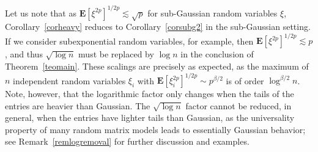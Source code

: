 \documentclass[aop,MSNbibl,dvips]{arximspdf}
\newcommand{\EE}{\mathbf{E}}
\begin{document}
Let us note that as $\EE[\xi^{2p}]^{1/2p}\lesssim\sqrt{p}$ for
sub-Gaussian random variables $\xi$, Corollary~\ref{corheavy} reduces
to Corollary~\ref{corsubg2} in the sub-Gaussian setting.\vspace*{1pt} If we consider
subexponential random variables, for example, then
$\EE[\xi^{2p}]^{1/2p}\lesssim p$, and thus $\sqrt{\log n}$ must be replaced
by $\log n$ in the conclusion of Theorem~\ref{teomain}. These scalings
are precisely as expected, as the maximum of $n$ independent random
variables $\xi_i$ with $\EE[\xi_i^{2p}]^{1/2p}\sim p^{\beta/2}$ is of
order $\log^{\beta/2}n$. Note, however, that the logarithmic factor only
changes when the tails of the entries are heavier than Gaussian.
The $\sqrt{\log n}$ factor cannot be reduced, in general, when the entries
have lighter tails than Gaussian, as the universality property of many
random matrix models leads to essentially Gaussian behavior; see
Remark~\ref{remlogremoval} for further discussion and examples.
\end{document}
